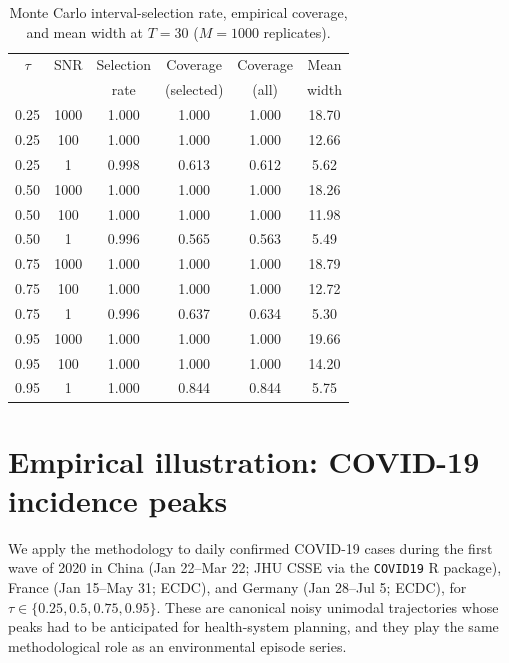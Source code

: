 \documentclass[11pt,a4paper]{article}
\begin{document}
\begin{table}[htbp]
\centering
\caption{Monte Carlo interval-selection rate, empirical coverage, and mean
width at $T=30$ ($M=1000$ replicates).}
\label{tab:mc}
\begin{tabular}{cccccc}
\toprule
$\tau$ & SNR & Selection & Coverage & Coverage & Mean \\
& & rate & (selected) & (all) & width \\
\midrule
0.25 & 1000 & 1.000 & 1.000 & 1.000 & 18.70 \\
0.25 &  100 & 1.000 & 1.000 & 1.000 & 12.66 \\
0.25 &    1 & 0.998 & 0.613 & 0.612 &  5.62 \\
\midrule
0.50 & 1000 & 1.000 & 1.000 & 1.000 & 18.26 \\
0.50 &  100 & 1.000 & 1.000 & 1.000 & 11.98 \\
0.50 &    1 & 0.996 & 0.565 & 0.563 &  5.49 \\
\midrule
0.75 & 1000 & 1.000 & 1.000 & 1.000 & 18.79 \\
0.75 &  100 & 1.000 & 1.000 & 1.000 & 12.72 \\
0.75 &    1 & 0.996 & 0.637 & 0.634 &  5.30 \\
\midrule
0.95 & 1000 & 1.000 & 1.000 & 1.000 & 19.66 \\
0.95 &  100 & 1.000 & 1.000 & 1.000 & 14.20 \\
0.95 &    1 & 1.000 & 0.844 & 0.844 &  5.75 \\
\bottomrule
\end{tabular}
\end{table}

\section{Empirical illustration: COVID-19 incidence peaks}
\label{sec:covid}

We apply the methodology to daily confirmed COVID-19 cases during the first
wave of 2020 in China (Jan 22--Mar 22; JHU CSSE via the \texttt{COVID19} R
package), France (Jan 15--May 31; ECDC), and Germany (Jan 28--Jul 5; ECDC),
for $\tau\in\{0.25,0.5,0.75,0.95\}$. These are canonical noisy unimodal
trajectories whose peaks had to be anticipated for health-system planning, and
they play the same methodological role as an environmental episode series.
\end{document}
